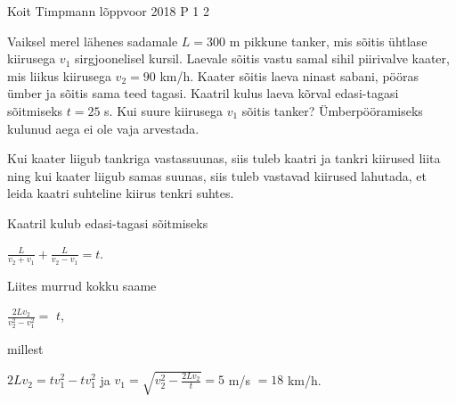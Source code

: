 {Koit Timpmann} %
{lõppvoor} %
{2018} %
{P 1} %
{2} %
{

\ifStatement
Vaiksel merel lähenes sadamale $L = 300$ m pikkune tanker, mis sõitis ühtlase kiirusega $v_1$ sirgjoonelisel kursil. Laevale sõitis vastu samal sihil piirivalve kaater, mis liikus kiirusega $v_2 = 90$ km/h. Kaater sõitis laeva ninast sabani, pööras ümber ja sõitis sama teed tagasi. Kaatril kulus laeva kõrval edasi-tagasi sõitmiseks $t = 25$ s. Kui suure kiirusega $v_1$ sõitis tanker? Ümberpööramiseks kulunud aega ei ole vaja arvestada. 
\fi

\ifHint
Kui kaater liigub tankriga vastassuunas, siis tuleb kaatri ja tankri kiirused liita ning kui kaater liigub samas suunas, siis tuleb vastavad kiirused lahutada, et leida kaatri suhteline kiirus tenkri suhtes.
\fi

\ifSolution
Kaatril kulub edasi-tagasi sõitmiseks 
\begin{center}
$\frac{L}{v_2 + v_1} + \frac{L}{v_2 - v_1} = t$.
\end{center}
Liites murrud kokku saame 
\begin{center}
$\frac{2Lv_2}{v_2 ^2 - v_1 ^2} =$ $t$, 
\end{center}
millest
\begin{center}
$2Lv_2 = tv_1 ^2 - tv_1 ^2$ ja $v_1 = \sqrt{ v_2 ^2 - \frac{2Lv_2}{t}} = 5$ m/s $= 18$ km/h.
\end{center}
\fi
}
